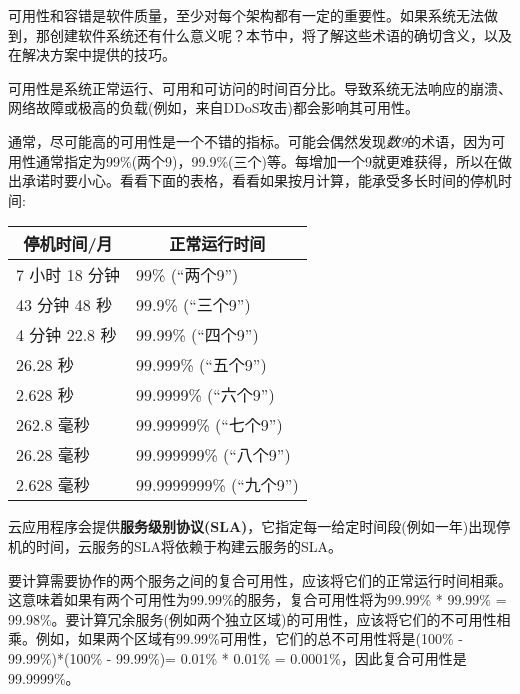 
可用性和容错是软件质量，至少对每个架构都有一定的重要性。如果系统无法做到，那创建软件系统还有什么意义呢？本节中，将了解这些术语的确切含义，以及在解决方案中提供的技巧。


可用性是系统正常运行、可用和可访问的时间百分比。导致系统无法响应的崩溃、网络故障或极高的负载(例如，来自DDoS攻击)都会影响其可用性。

通常，尽可能高的可用性是一个不错的指标。可能会偶然发现\textit{数9}的术语，因为可用性通常指定为99\%(两个9)，99.9\%(三个)等。每增加一个9就更难获得，所以在做出承诺时要小心。看看下面的表格，看看如果按月计算，能承受多长时间的停机时间:

\begin{table}[H]
	\begin{tabular}{|l|l|}
		\hline
		\multicolumn{1}{|c|}{\textbf{停机时间/月}} & \multicolumn{1}{c|}{\textbf{正常运行时间}} \\ \hline
		7 小时 18 分钟                            & 99\% (“两个9”)                   \\ \hline
		43 分钟 48 秒                         & 99.9\% (“三个9”)               \\ \hline
		4 分钟 22.8 秒                        & 99.99\% (“四个9”)               \\ \hline
		26.28 秒                                 & 99.999\% (“五个9”)              \\ \hline
		2.628 秒                                 & 99.9999\% (“六个9”)              \\ \hline
		262.8 毫秒                                      & 99.99999\% (“七个9”)           \\ \hline
		26.28 毫秒                                      & 99.999999\% (“八个9”)          \\ \hline
		2.628 毫秒                                      & 99.9999999\% (“九个9”)          \\ \hline
	\end{tabular}
\end{table}

云应用程序会提供\textbf{服务级别协议(SLA)}，它指定每一给定时间段(例如一年)出现停机的时间，云服务的SLA将依赖于构建云服务的SLA。

要计算需要协作的两个服务之间的复合可用性，应该将它们的正常运行时间相乘。这意味着如果有两个可用性为99.99\%的服务，复合可用性将为99.99\% * 99.99\% = 99.98\%。要计算冗余服务(例如两个独立区域)的可用性，应该将它们的不可用性相乘。例如，如果两个区域有99.99\%可用性，它们的总不可用性将是(100\% - 99.99\%)*(100\% - 99.99\%)= 0.01\% * 0.01\% = 0.0001\%，因此复合可用性是99.9999\%。

